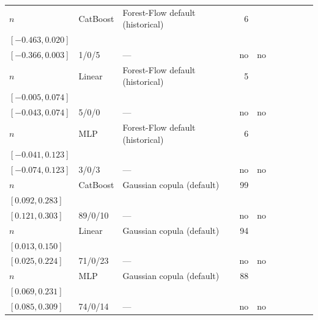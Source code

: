 \begin{longtable}{@{}ll>{\raggedright\arraybackslash}p{1.1in}rllrlll@{}}
$n$ & CatBoost & Forest-Flow default (historical) & 6 & \begin{tabular}[t]{@{}l@{}}$-0.045$\\\tiny$[-0.463, 0.020]$\end{tabular} & \begin{tabular}[t]{@{}l@{}}$-0.206$\\\tiny$[-0.366, 0.003]$\end{tabular} & 1/0/5 & --- & no & no \\
$n$ & Linear & Forest-Flow default (historical) & 5 & \begin{tabular}[t]{@{}l@{}}$0.024$\\\tiny$[-0.005, 0.074]$\end{tabular} & \begin{tabular}[t]{@{}l@{}}$0.037$\\\tiny$[-0.043, 0.074]$\end{tabular} & 5/0/0 & --- & no & no \\
$n$ & MLP & Forest-Flow default (historical) & 6 & \begin{tabular}[t]{@{}l@{}}$0.005$\\\tiny$[-0.041, 0.123]$\end{tabular} & \begin{tabular}[t]{@{}l@{}}$0.010$\\\tiny$[-0.074, 0.123]$\end{tabular} & 3/0/3 & --- & no & no \\
$n$ & CatBoost & Gaussian copula (default) & 99 & \begin{tabular}[t]{@{}l@{}}$0.222$\\\tiny$[0.092, 0.283]$\end{tabular} & \begin{tabular}[t]{@{}l@{}}$0.229$\\\tiny$[0.121, 0.303]$\end{tabular} & 89/0/10 & --- & no & no \\
$n$ & Linear & Gaussian copula (default) & 94 & \begin{tabular}[t]{@{}l@{}}$0.048$\\\tiny$[0.013, 0.150]$\end{tabular} & \begin{tabular}[t]{@{}l@{}}$0.104$\\\tiny$[0.025, 0.224]$\end{tabular} & 71/0/23 & --- & no & no \\
$n$ & MLP & Gaussian copula (default) & 88 & \begin{tabular}[t]{@{}l@{}}$0.129$\\\tiny$[0.069, 0.231]$\end{tabular} & \begin{tabular}[t]{@{}l@{}}$0.178$\\\tiny$[0.085, 0.309]$\end{tabular} & 74/0/14 & --- & no & no \\

\end{longtable}
